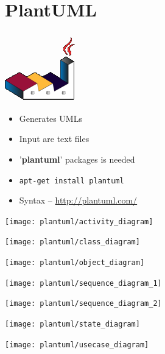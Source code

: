 \section{PlantUML}


{
\begin{center}
\includegraphics[scale=0.5]{pic/plantuml_logo}
\end{center}
\begin{itemize}
\item Generates UMLs
\item Input are text files
\item '\textbf{plantuml}' packages is needed
\item \texttt{apt-get install plantuml}
\item Syntax -- \url{http://plantuml.com/}
\end{itemize}
}


{
\begin{center}
\texttt{[image: plantuml/activity\_diagram]}
\end{center}
}


{
\begin{center}
\texttt{[image: plantuml/class\_diagram]}
\end{center}
}


{
\begin{center}
\texttt{[image: plantuml/object\_diagram]}
\end{center}
}


{
\begin{center}
\texttt{[image: plantuml/sequence\_diagram\_1]}
\end{center}
}


{
\begin{center}
\texttt{[image: plantuml/sequence\_diagram\_2]}
\end{center}
}


{
\begin{center}
\texttt{[image: plantuml/state\_diagram]}
\end{center}
}


{
\begin{center}
\texttt{[image: plantuml/usecase\_diagram]}
\end{center}
}
